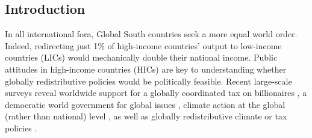 \documentclass[12pt,english]{article}
\begin{document}
\begin{bibunit}

\section{Introduction}\label{sec:intro}

In all international fora, Global South countries seek %
a more equal world order. Indeed, redirecting just 1\% of high-income countries' output to low-income countries (LICs) would mechanically double their national income. %
Public attitudes in high-income countries (HICs) are key to understanding whether globally redistributive policies would be politically feasible.
Recent large-scale surveys reveal worldwide support for a globally coordinated tax on billionaires \citep{cappelen_majority_2025}, a democratic world government for global issues \citep{ghassim_who_2024}, climate action at the global (rather than national) level \citep{dechezlepretre_fighting_2025}, as well as globally redistributive climate or tax policies \citep{fabre_majority_2025}.


\end{bibunit}
\end{document}
